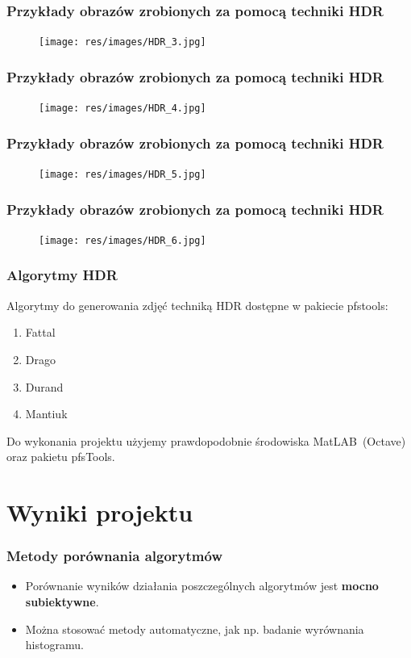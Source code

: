 \documentclass{beamer}
\begin{document}
\begin{frame}
	\frametitle{Przykłady obrazów zrobionych za pomocą techniki HDR}
	\begin{figure}
		\texttt{[image: res/images/HDR\_3.jpg]}
	\end{figure}
\end{frame}

\begin{frame}
	\frametitle{Przykłady obrazów zrobionych za pomocą techniki HDR}
	\begin{figure}
		\texttt{[image: res/images/HDR\_4.jpg]}
	\end{figure}
\end{frame}

\begin{frame}
	\frametitle{Przykłady obrazów zrobionych za pomocą techniki HDR}
	\begin{figure}
		\texttt{[image: res/images/HDR\_5.jpg]}
	\end{figure}
\end{frame}

\begin{frame}
	\frametitle{Przykłady obrazów zrobionych za pomocą techniki HDR}
	\begin{figure}
		\texttt{[image: res/images/HDR\_6.jpg]}
	\end{figure}
\end{frame}

\begin{frame}
	\frametitle{Algorytmy HDR}
	Algorytmy do generowania zdjęć techniką HDR dostępne w pakiecie pfstools:
	\begin{enumerate}
		\item Fattal
		\item Drago
		\item Durand
		\item Mantiuk
	\end{enumerate}
	Do wykonania projektu użyjemy prawdopodobnie środowiska MatLAB~(Octave) oraz pakietu pfsTools.
\end{frame}

\section{Wyniki projektu}
\begin{frame}
	\frametitle{Metody porównania algorytmów}
	\begin{itemize}
	\item Porównanie wyników działania poszczególnych algorytmów jest \textbf{mocno subiektywne}.
	\item Można stosować metody automatyczne, jak np. badanie wyrównania histogramu.
	\end{itemize}
\end{frame}
\end{document}
